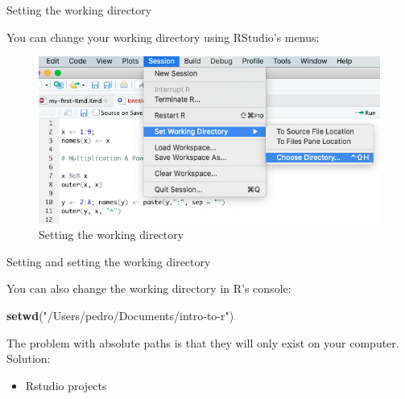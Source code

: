 \documentclass[ignorenonframetext,]{beamer}
\newenvironment{Shaded}{\begin{snugshade}}{\end{snugshade}}
\newcommand{\KeywordTok}[1]{\textcolor[rgb]{0.13,0.29,0.53}{\textbf{#1}}}
\newcommand{\NormalTok}[1]{#1}
\newcommand{\StringTok}[1]{\textcolor[rgb]{0.31,0.60,0.02}{#1}}
\providecommand{\tightlist}{%
  \setlength{\itemsep}{0pt}\setlength{\parskip}{0pt}}
\begin{document}
\begin{frame}{Setting the working directory}
\protect\hypertarget{setting-the-working-directory}{}

You can change your working directory using RStudio's menus:

\begin{figure}
\includegraphics[scale = .40]{figures/wd}
\caption{Setting the working directory}
\end{figure}

\end{frame}

\begin{frame}[fragile]{Setting and setting the working directory}
\protect\hypertarget{setting-and-setting-the-working-directory}{}

You can also change the working directory in R's console:

\begin{Shaded}
\begin{Highlighting}[]
\KeywordTok{setwd}\NormalTok{(}\StringTok{"/Users/pedro/Documents/intro-to-r"}\NormalTok{)}
\end{Highlighting}
\end{Shaded}

The problem with absolute paths is that they will only exist on your
computer. Solution:

\begin{itemize}
\tightlist
\item
  Rstudio projects
\end{itemize}

\end{frame}
\end{document}
